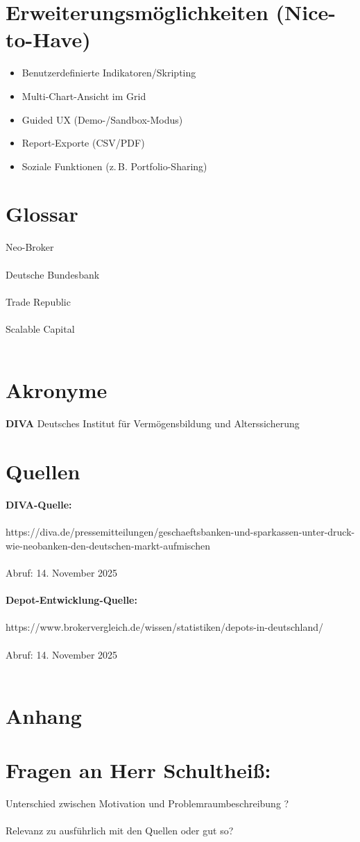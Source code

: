 \documentclass{article}
\begin{document}
\section{Erweiterungsmöglichkeiten (Nice-to-Have)}
\begin{itemize}
  \item Benutzerdefinierte Indikatoren/Skripting
  \item Multi-Chart-Ansicht im Grid
  \item Guided UX (Demo-/Sandbox-Modus)
  \item Report-Exporte (CSV/PDF)
  \item Soziale Funktionen (z.\,B. Portfolio-Sharing)
\end{itemize}
\newpage
\section{Glossar}
Neo-Broker
\\\\
Deutsche Bundesbank
\\\\
Trade Republic
\\\\
Scalable Capital
\\\\
\newpage
\section{Akronyme}
\textbf{DIVA} Deutsches Institut für Vermögensbildung und Alterssicherung
\newpage
\section{Quellen}
\textbf{DIVA-Quelle:} 
\\\\
https://diva.de/pressemitteilungen/geschaeftsbanken-und-sparkassen-unter-druck-wie-neobanken-den-deutschen-markt-aufmischen
\\\\
Abruf: 14. November 2025 
\\\\
\textbf{Depot-Entwicklung-Quelle:}
\\\\
https://www.brokervergleich.de/wissen/statistiken/depots-in-deutschland/
\\\\
Abruf: 14. November 2025 
\\\\
\section{Anhang}



\newpage
\section{Fragen an Herr Schultheiß:}
Unterschied zwischen Motivation und Problemraumbeschreibung ?
\\\\
Relevanz zu ausführlich mit den Quellen oder gut so?
\end{document}
